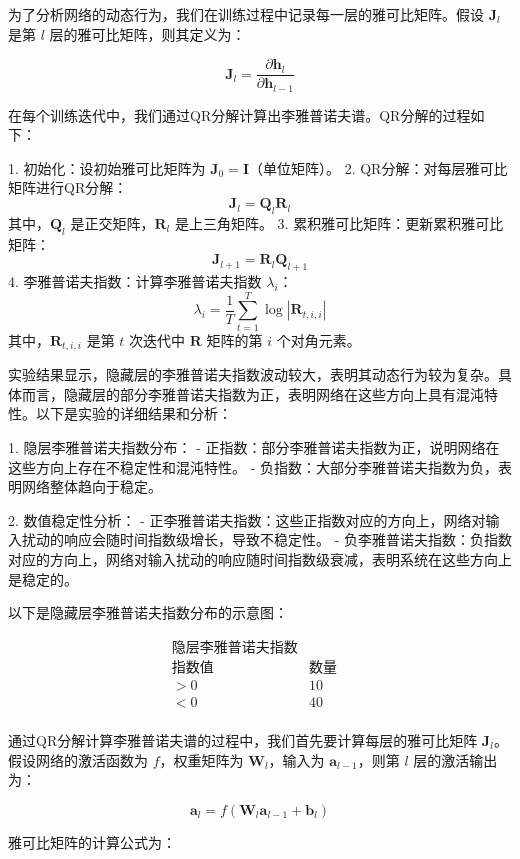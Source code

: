 \documentclass[12pt,a4paper]{amsart}
\begin{document}
为了分析网络的动态行为，我们在训练过程中记录每一层的雅可比矩阵。假设 \(\mathbf{J}_l\) 是第 \(l\) 层的雅可比矩阵，则其定义为：

\[
\mathbf{J}_l = \frac{\partial \mathbf{h}_l}{\partial \mathbf{h}_{l-1}}
\]

在每个训练迭代中，我们通过QR分解计算出李雅普诺夫谱。QR分解的过程如下：

1. 初始化：设初始雅可比矩阵为 \(\mathbf{J}_0 = \mathbf{I}\)（单位矩阵）。
2. QR分解：对每层雅可比矩阵进行QR分解：
   \[
   \mathbf{J}_l = \mathbf{Q}_l \mathbf{R}_l
   \]
   其中，\(\mathbf{Q}_l\) 是正交矩阵，\(\mathbf{R}_l\) 是上三角矩阵。
3. 累积雅可比矩阵：更新累积雅可比矩阵：
   \[
   \mathbf{J}_{l+1} = \mathbf{R}_l \mathbf{Q}_{l+1}
   \]
4. 李雅普诺夫指数：计算李雅普诺夫指数 \(\lambda_i\)：
   \[
   \lambda_i = \frac{1}{T} \sum_{t=1}^T \log |\mathbf{R}_{t,i,i}|
   \]
   其中，\(\mathbf{R}_{t,i,i}\) 是第 \(t\) 次迭代中 \(\mathbf{R}\) 矩阵的第 \(i\) 个对角元素。

实验结果显示，隐藏层的李雅普诺夫指数波动较大，表明其动态行为较为复杂。具体而言，隐藏层的部分李雅普诺夫指数为正，表明网络在这些方向上具有混沌特性。以下是实验的详细结果和分析：

1. 隐层李雅普诺夫指数分布：
   - 正指数：部分李雅普诺夫指数为正，说明网络在这些方向上存在不稳定性和混沌特性。
   - 负指数：大部分李雅普诺夫指数为负，表明网络整体趋向于稳定。

2. 数值稳定性分析：
   - 正李雅普诺夫指数：这些正指数对应的方向上，网络对输入扰动的响应会随时间指数级增长，导致不稳定性。
   - 负李雅普诺夫指数：负指数对应的方向上，网络对输入扰动的响应随时间指数级衰减，表明系统在这些方向上是稳定的。

以下是隐藏层李雅普诺夫指数分布的示意图：

\[
\begin{array}{ccc}
\text{隐层李雅普诺夫指数} & & \\
\hline
\text{指数值} & \text{数量} \\
\hline
>0 & 10 \\
<0 & 40 \\
\end{array}
\]

通过QR分解计算李雅普诺夫谱的过程中，我们首先要计算每层的雅可比矩阵 \(\mathbf{J}_l\)。假设网络的激活函数为 \( f \)，权重矩阵为 \(\mathbf{W}_l\)，输入为 \(\mathbf{a}_{l-1}\)，则第 \(l\) 层的激活输出为：

\[
\mathbf{a}_l = f(\mathbf{W}_l \mathbf{a}_{l-1} + \mathbf{b}_l)
\]

雅可比矩阵的计算公式为：
\end{document}
